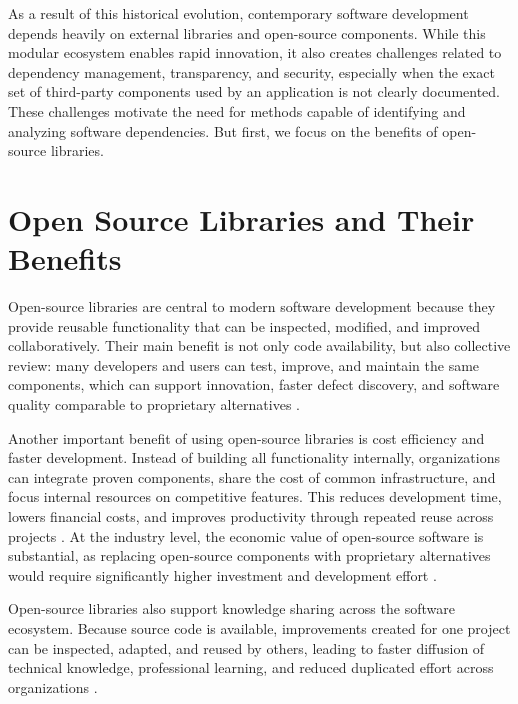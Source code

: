 \documentclass[12pt,a4paper]{report}
\begin{document}
As a result of this historical evolution, contemporary software development depends heavily on external libraries and open-source components. While this modular ecosystem enables rapid innovation, it also creates challenges related to dependency management, transparency, and security, especially when the exact set of third-party components used by an application is not clearly documented. These challenges motivate the need for methods capable of identifying and analyzing software dependencies. But first, we focus on the benefits of open-source libraries.

\section{Open Source Libraries and Their Benefits}

Open-source libraries are central to modern software development because they provide reusable functionality that can be inspected, modified, and improved collaboratively. Their main benefit is not only code availability, but also collective review: many developers and users can test, improve, and maintain the same components, which can support innovation, faster defect discovery, and software quality comparable to proprietary alternatives \parencite{oreillyLessonsOpensourceSoftware1999,weberPoliticalEconomyOpen2000}.

Another important benefit of using open-source libraries is cost efficiency and faster development. Instead of building all functionality internally, organizations can integrate proven components, share the cost of common infrastructure, and focus internal resources on competitive features. This reduces development time, lowers financial costs, and improves productivity through repeated reuse across projects \parencite{chesbroughMeasuringEconomicValue2023,ajilaEmpiricalStudyEffects2007,lernerEconomicsTechnologySharing2005}. At the industry level, the economic value of open-source software is substantial, as replacing open-source components with proprietary alternatives would require significantly higher investment and development effort \parencite{hoffmannValueOpenSource2024}.

Open-source libraries also support knowledge sharing across the software ecosystem. Because source code is available, improvements created for one project can be inspected, adapted, and reused by others, leading to faster diffusion of technical knowledge, professional learning, and reduced duplicated effort across organizations \parencite{chesbroughMeasuringEconomicValue2023,lernerSimpleEconomicsOpen2002}.
\end{document}
